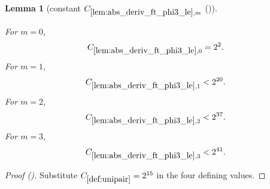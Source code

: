 \documentclass[12pt,reqno]{amsart}
\newcommand{\auto}{{({\tiny\faCar})}}
\theoremstyle{plain}
\newtheorem{lemma}[theorem]{Lemma}
\numberwithin{equation}{section}
\theoremstyle{remark}
\newcommand{\uses}[1]{}
\newcommand{\usesdefs}[1]{}
\newcommand{\leanok}{}
\newcommand{\lean}[1]{}
\begin{document}
\begin{lemma}[constant $C_{\ref{lem:abs_deriv_ft_phi3_le},m}$ \auto]\label{constant phi three derivative}\uses{lem:abs_deriv_ft_phi3_le}\usesdefs{def:unipair}
\lean{Auto.constantPhiThreeDerivative}
\leanok
For $m=0$,
\begin{equation}\label{constant phi three derivative bound}
C_{\ref{lem:abs_deriv_ft_phi3_le},0}=2^2.
\end{equation}
For $m=1$,
\begin{equation}\label{auto:constant-phi-three-derivative-one}
C_{\ref{lem:abs_deriv_ft_phi3_le},1}<2^{20}.
\end{equation}
For $m=2$,
\begin{equation}\label{auto:constant-phi-three-derivative-two}
C_{\ref{lem:abs_deriv_ft_phi3_le},2}<2^{37}.
\end{equation}
For $m=3$,
\begin{equation}\label{auto:constant-phi-three-derivative-three}
C_{\ref{lem:abs_deriv_ft_phi3_le},3}<2^{41}.
\end{equation}
\end{lemma}
\begin{proof}[Proof \auto]
Substitute $C_{\ref{def:unipair}}=2^{15}$ in the four defining values.
\end{proof}
\end{document}
